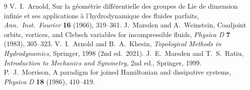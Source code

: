 \documentclass[11pt]{article}
\theoremstyle{definition}
\begin{document}
\begin{thebibliography}{9}
 V.~I.~Arnold, Sur la géométrie différentielle des groupes de Lie de dimension infinie et ses
applications à l'hydrodynamique des fluides parfaits, \emph{Ann.\ Inst.\ Fourier} \textbf{16} (1966), 319--361.
 J.~Marsden and A.~Weinstein, Coadjoint orbits, vortices, and Clebsch variables for incompressible
fluids, \emph{Physica D} \textbf{7} (1983), 305--323.
 V.~I.~Arnold and B.~A.~Khesin, \emph{Topological Methods in Hydrodynamics}, Springer, 1998
(2nd ed.\ 2021).
 J.~E.~Marsden and T.~S.~Ratiu, \emph{Introduction to Mechanics and Symmetry}, 2nd ed., Springer, 1999.
 P.~J.~Morrison, A paradigm for joined Hamiltonian and dissipative systems,
\emph{Physica D} \textbf{18} (1986), 410--419.
\end{thebibliography}
\end{document}
